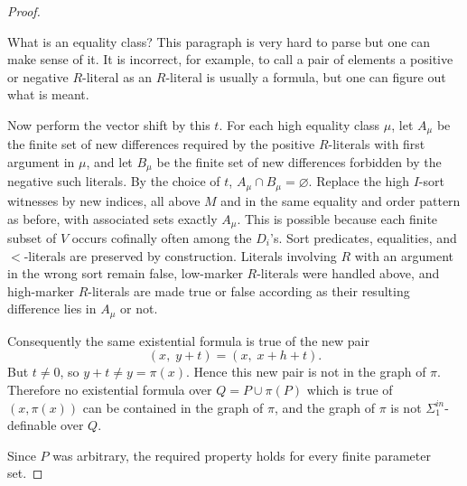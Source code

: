 \documentclass[12pt]{article}
\newcommand{\review}[1]{\begin{reviewbox}#1\end{reviewbox}}
\begin{document}
\begin{proof}
\review{What is an equality class? This paragraph is very hard to parse but one can make sense of it. It is incorrect, for example, to call a pair of elements a positive or negative $R$-literal as an $R$-literal is usually a formula, but one can figure out what is meant.}

Now perform the vector shift by this $t$.  For each high equality class
$\mu$, let $A_\mu$ be the finite set of new differences required by the
positive $R$-literals with first argument in $\mu$, and let $B_\mu$ be
the finite set of new differences forbidden by the negative such
literals.  By the choice of $t$, $A_\mu\cap B_\mu=\varnothing$.  Replace
the high $I$-sort witnesses by new indices, all above $M$ and in the
same equality and order pattern as before, with associated sets exactly
$A_\mu$.  This is possible because each finite subset of $V$ occurs
cofinally often among the $D_i$'s.  Sort predicates, equalities, and
$<$-literals are preserved by construction.  Literals involving $R$ with
an argument in the wrong sort remain false, low-marker $R$-literals were
handled above, and high-marker $R$-literals are made true or false
according as their resulting difference lies in $A_\mu$ or not.

Consequently the same existential formula is true of the new pair
\[
        (x,\;y+t)=(x,\;x+h+t).
\]
But $t\neq0$, so $y+t\neq y=\pi(x)$.  Hence this new pair is not in the
graph of $\pi$.  Therefore no existential formula over
$Q=P\cup\pi(P)$ which is true of $(x,\pi(x))$ can be contained in the
graph of $\pi$, and the graph of $\pi$ is not
$\Sigma^{in}_1$-definable over $Q$.

Since $P$ was arbitrary, the required property holds for every finite
parameter set.
\end{proof}
\end{document}
